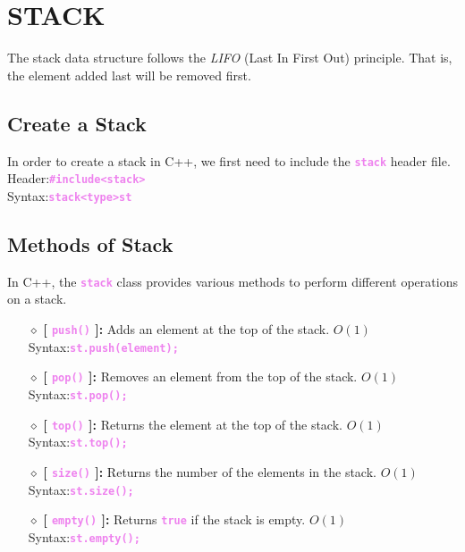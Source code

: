 \section{STACK}
The stack data structure follows the \emph{LIFO} (Last In First Out) principle. That is, the element added last will be removed first.

\subsection{Create a Stack}
In order to create a stack in C++, we first need to include the \textbf{\textcolor{violet}{\texttt{stack}}} header file.\\
\tab Header:\tab \textbf{\textcolor{violet}{\texttt{\#include<stack>}}}\\
\tab Syntax:\tab \textbf{\textcolor{violet}{\texttt{stack<type>st}}}\\

\subsection{Methods of Stack}
In C++, the \textbf{\textcolor{violet}{\texttt{stack}}} class provides various methods to perform different operations on a stack.

\begin{itemize}

	\item[{\LARGE $\diamond$}] \textbf{[ \textcolor{violet}{\texttt{push()}} ]:} Adds an element at the top of the stack. $O(1)$\\
	\tab Syntax:\tab \textbf{\textcolor{violet}{\texttt{st.push(element);}}}
	
	\item[{\LARGE $\diamond$}] \textbf{[ \textcolor{violet}{\texttt{pop()}} ]:} Removes an element from the top of the stack. $O(1)$\\
	\tab Syntax:\tab \textbf{\textcolor{violet}{\texttt{st.pop();}}}
	
	\item[{\LARGE $\diamond$}] \textbf{[ \textcolor{violet}{\texttt{top()}} ]:} Returns the element at the top of the stack. $O(1)$\\
	\tab Syntax:\tab \textbf{\textcolor{violet}{\texttt{st.top();}}}
	
	\item[{\LARGE $\diamond$}] \textbf{[ \textcolor{violet}{\texttt{size()}} ]:} Returns the number of the elements in the stack. $O(1)$\\
	\tab Syntax:\tab \textbf{\textcolor{violet}{\texttt{st.size();}}}
	
	\item[{\LARGE $\diamond$}] \textbf{[ \textcolor{violet}{\texttt{empty()}} ]:} Returns \textbf{\textcolor{violet}{\texttt{true}}} if the stack is empty. $O(1)$\\
	\tab Syntax:\tab \textbf{\textcolor{violet}{\texttt{st.empty();}}}
	
\end{itemize}


